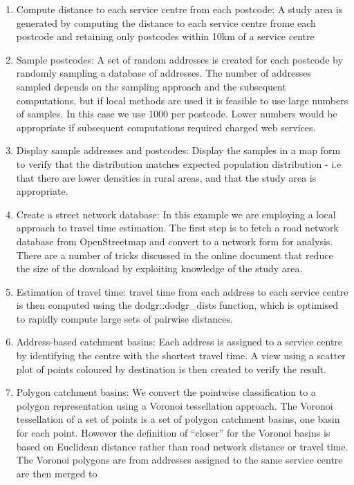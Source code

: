 \documentclass[]{article}
\begin{document}
\begin{enumerate}
\def\labelenumi{\arabic{enumi}.}
\item
  Compute distance to each service centre from each postcode: A study
  area is generated by computing the distance to each service centre
  frome each postcode and retaining only postcodes within 10km of a
  service centre
\item
  Sample postcodes: A set of random addresses is created for each
  postcode by randomly sampling a database of addresses. The number of
  addresses sampled depends on the sampling approach and the subsequent
  computations, but if local methods are used it is feasible to use
  large numbers of samples. In this case we use 1000 per postcode. Lower
  numbers would be appropriate if subsequent computations required
  charged web services.
\item
  Display sample addresses and postcodes: Display the samples in a map
  form to verify that the distribution matches expected population
  distribution - i.e that there are lower densities in rural areas, and
  that the study area is appropriate.
\item
  Create a street network database: In this example we are employing a
  local approach to travel time estimation. The first step is to fetch a
  road network database from OpenStreetmap and convert to a network form
  for analysis. There are a number of tricks discussed in the online
  document that reduce the size of the download by exploiting knowledge
  of the study area.
\item
  Estimation of travel time: travel time from each address to each
  service centre is then computed using the dodgr::dodgr\_dists
  function, which is optimised to rapidly compute large sets of pairwise
  distances.
\item
  Address-based catchment basins: Each address is assigned to a service
  centre by identifying the centre with the shortest travel time. A view
  using a scatter plot of points coloured by destination is then created
  to verify the result.
\item
  Polygon catchment basins: We convert the pointwise classification to a
  polygon representation using a Voronoi tessellation approach. The
  Voronoi tessellation of a set of points is a set of polygon catchment
  basins, one basin for each point. However the definition of ``closer''
  for the Voronoi basins is based on Euclidean distance rather than road
  network distance or travel time. The Voronoi polygons are from
  addresses assigned to the same service centre are then merged to

\end{enumerate}
\end{document}

